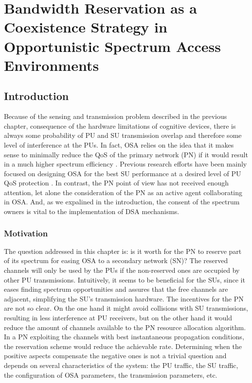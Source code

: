 \graphicspath{ {img/BR/} }
\chapter[Bandwidth Reservation as a Coexistence Strategy in Opportunistic Spectrum Access Environments][Bandwidth Reservation in OSA]{Bandwidth Reservation as a Coexistence Strategy in Opportunistic Spectrum Access Environments}\label{BR_chap}
\section{Introduction}\label{sec:Introduction}
Because of the sensing and transmission problem described in the previous chapter, consequence of the hardware limitations of cognitive devices, there is always some probability of PU and SU transmission overlap and therefore some level of interference at the PUs.
In fact, OSA relies on the idea that it makes sense to minimally reduce the QoS of the primary network (PN) if it would result in a much higher spectrum efficiency \cite{ref:comparativaMAC}.
Previous research efforts have been mainly focused on designing OSA for the best SU performance at a desired level of PU QoS protection \cite{ref:SurveyMACs}. In contrast, the PN point of view has not received enough attention, let alone the consideration of the PN as an active agent collaborating in OSA. And, as we expalined in the introduction, the consent of the spectrum owners is vital to the implementation of DSA mechanisms. 

\subsection{Motivation}
The question addressed in this chapter is: is it worth for the PN to reserve part of its spectrum for easing OSA to a secondary network (SN)? The reserved channels will only be used by the PUs if the non-reserved ones are occupied by other PU transmissions. 
Intuitively, it seems to be beneficial for the SUs, since it eases finding spectrum opportunities and assures that the free channels are adjacent, simplifying the SU's transmission hardware.
The incentives for the PN are not so clear. On the one hand it might avoid collisions with SU transmissions, resulting in less interference at PU receivers, but on the other hand it would reduce the amount of channels available to the PN resource allocation algorithm. In a PN exploiting the channels with best instantaneous propagation conditions, the reservation scheme would reduce the achievable rate.
Determining when the positive aspects compensate the negative ones is not a trivial question and depends on several characteristics of the system: the PU traffic, the SU traffic, the configuration of OSA parameters, the transmission parameters, etc.

